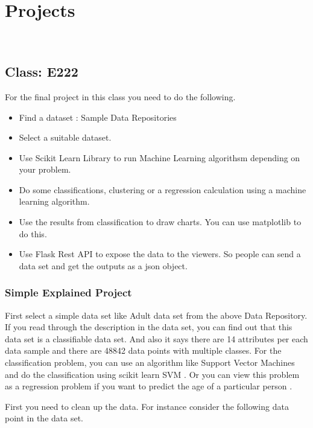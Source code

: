 \chapter{Projects}
\label{c:projects}
\FILENAME\

\section{Class: E222}

For the final project in this class you need to do the following.

\begin{itemize}
\item Find a dataset : Sample Data Repositories 
\item Select a suitable dataset.
\item Use Scikit Learn Library to run Machine Learning algorithsm depending on your problem.
\item Do some classifications, clustering or a regression calculation using a machine learning algorithm.
\item Use the results from classification to draw charts. You can use matplotlib to do this.
\item Use Flask Rest API to expose the data to the viewers. So people can send a data set and get the outputs as a json object.   
\end{itemize}


\subsection{Simple Explained Project}

First select a simple data set like Adult data set from the above Data
Repository. If you read through the description in the data set, you
can find out that this data set is a classifiable data set. And also
it says there are 14 attributes per each data sample and there are
48842 data points with multiple classes. For the classification
problem, you can use an algorithm like Support Vector Machines and do
the classification using scikit learn SVM
. Or you can view
this problem as a regression problem if you want to predict the age of
a particular person
.

First you need to clean up the data. For instance consider the following data point in the data set. 

